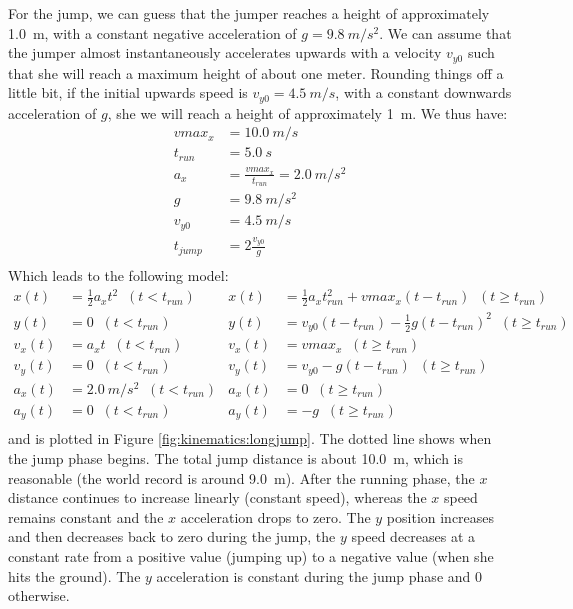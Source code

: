 \begin{solution}
For the jump, we can guess that the jumper reaches a height of approximately \SI{1.0}{m}, with a constant negative acceleration of $g=\SI{9.8}{m/s^2}$. We can assume that the jumper almost instantaneously accelerates upwards with a velocity $v_{y0}$ such that she will reach a maximum height of about one meter. Rounding things off a little bit, if the initial upwards speed is $v_{y0}=\SI{4.5}{m/s}$, with a constant downwards acceleration of $g$, she we will reach a height of approximately \SI{1}{m}. We thus have:
\begin{align*}
vmax_x &= \SI{10.0}{m/s}\\
t_{run} &= \SI{5.0}{s}\\
a_x &= \frac{vmax_x}{t_{run}}=\SI{2.0}{m/s^2}\\
g &= \SI{9.8}{m/s^2}\\
v_{y0} &= \SI{4.5}{m/s}\\
t_{jump} &= 2\frac{v_{y0}}{g}\\
\end{align*}
Which leads to the following model:
\begin{align*}
x(t) &= \frac{1}{2}a_xt^2\;\;(t<t_{run})&
x(t) & = \frac{1}{2}a_xt_{run}^2 + vmax_x(t-t_{run})\;\;(t\geq t_{run})\\
y(t) &= 0\;\;(t<t_{run})&
y(t) & =v_{y0}(t-t_{run})- \frac{1}{2}g(t-t_{run})^2 \;\;(t\geq t_{run})\\
v_x(t) &= a_xt\;\;(t<t_{run})&
v_x(t) & = vmax_x\;\;(t\geq t_{run})\\
v_y(t) &= 0\;\;(t<t_{run})&
v_y(t) & = v_{y0}-g(t-t_{run})\;\;(t\geq t_{run})\\
a_x(t) &= \SI{2.0}{m/s^2}\;\;(t<t_{run})&
a_x(t) &= 0\;\;(t\geq t_{run})\\
a_y(t) &= 0\;\;(t<t_{run})&
a_y(t) & = -g\;\;(t\geq t_{run})\\
\end{align*}
and is plotted in Figure \ref{fig:kinematics:longjump}. The dotted line shows when the jump phase begins. The total jump distance is about \SI{10.0}{m}, which is reasonable (the world record is around \SI{9.0}{m}). After the running phase, the $x$ distance continues to increase linearly (constant speed), whereas the $x$ speed remains constant and the $x$ acceleration drops to zero. The $y$ position increases and then decreases back to zero during the jump, the $y$ speed decreases at a constant rate from a positive value (jumping up) to a negative value (when she hits the ground). The $y$ acceleration is constant during the jump phase and 0 otherwise.


\end{solution}

